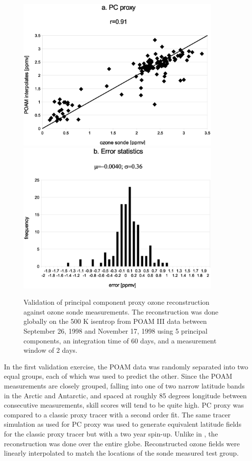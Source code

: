 \begin{figure}
  \centering
  \includegraphics[width=0.9\textwidth]{global_PC_sonde_scatter}
  \includegraphics[width=0.9\textwidth]{global_PC_sonde_error}
  \caption{Validation of principal component proxy ozone reconstruction against ozone sonde measurements. The reconstruction was done globally on the 500 K isentrop from POAM III data between September 26, 1998 and November 17, 1998 using 5 principal components,  an integration time of 60 days, and a measurement window of 2 days.}
  \label{global_PC_sonde}
\end{figure}

In the first validation exercise, the POAM data was randomly separated into two
equal groups, each of which was used to predict the other.
Since the POAM measurements are closely grouped, falling into one of two narrow
latitude bands in the Arctic and Antarctic, and spaced at roughly 85 degrees
longitude between consecutive measurements, skill scores will tend to be
quite high.
PC proxy was compared to a classic proxy tracer with a second order fit.
The same tracer simulation as used for PC proxy was used to generate 
equivalent latitude fields \citep{Allen_Nakamura2003} for the classic proxy
tracer but with a two year spin-up.
Unlike in \citet{Randall_etal2002}, the reconstruction was done over the entire
globe.
Reconstructed ozone fields were linearly interpolated to match the locations
of the sonde measured test group.

